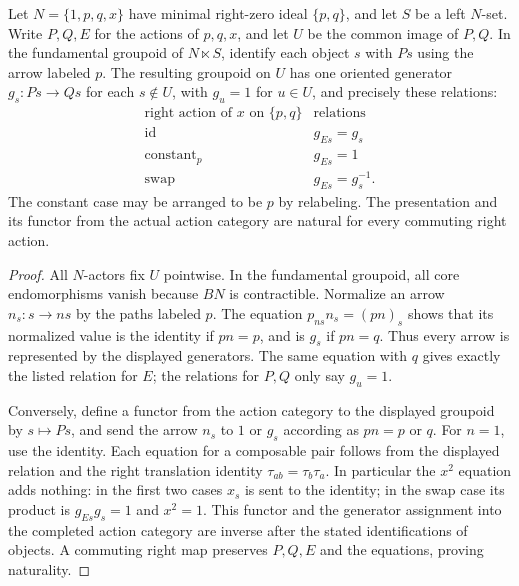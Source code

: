 \begin{lemma}
\label{C:four-corner-normalized-action-groupoid}
Let $N=\{1,p,q,x\}$ have minimal right-zero ideal
$\{p,q\}$, and let $S$ be a left $N$-set. Write $P,Q,E$
for the actions of $p,q,x$, and let $U$ be the common image
of $P,Q$. In the fundamental groupoid of $N\ltimes S$,
identify each object $s$ with $Ps$ using the arrow labeled
$p$. The resulting groupoid on $U$ has one oriented
generator $g_s:Ps\to Qs$ for each $s\notin U$, with
$g_u=1$ for $u\in U$, and precisely these relations:
\[
\begin{array}{c|c}
\text{right action of $x$ on $\{p,q\}$}&\text{relations}\\\hline
\mathrm{id}&g_{Es}=g_s\\
\mathrm{constant}_p&g_{Es}=1\\
\mathrm{swap}&g_{Es}=g_s^{-1}.
\end{array}
\]
The constant case may be arranged to be $p$ by relabeling.
The presentation and its functor from the actual action
category are natural for every commuting right action.
\end{lemma}
\begin{proof}
All $N$-actors fix $U$ pointwise. In the fundamental groupoid,
all core endomorphisms vanish because $BN$ is contractible.
Normalize an arrow $n_s:s\to ns$ by the paths labeled $p$.
The equation $p_{ns}n_s=(pn)_s$ shows that its normalized
value is the identity if $pn=p$, and is $g_s$ if $pn=q$.
Thus every arrow is represented by the displayed generators.
The same equation with $q$ gives exactly the listed relation
for $E$; the relations for $P,Q$ only say $g_u=1$.

Conversely, define a functor from the action category to the
displayed groupoid by $s\mapsto Ps$, and send the arrow
$n_s$ to $1$ or $g_s$ according as $pn=p$ or $q$.
For $n=1$, use the identity. Each equation for a composable
pair follows from the displayed relation and the right
translation identity $\tau_{ab}=\tau_b\tau_a$.
In particular the $x^2$ equation adds nothing: in the first
two cases $x_s$ is sent to the identity; in the swap case
its product is $g_{Es}g_s=1$ and $x^2=1$.
This functor and the generator assignment into the completed
action category are inverse after the stated identifications
of objects. A commuting right map preserves $P,Q,E$ and
the equations, proving naturality.
\end{proof}

